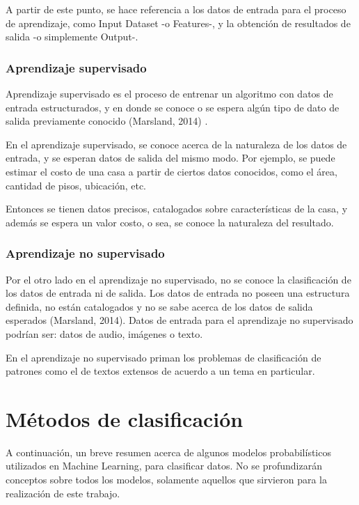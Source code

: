 \documentclass[a4paper,12pt,oneside,spanish]{book}
\begin{document}
A partir de este punto, se hace referencia a los datos de entrada para el proceso de aprendizaje, como Input Dataset -o Features-, y la obtención de resultados de salida -o simplemente Output-.\par

\subsubsection{Aprendizaje supervisado}

Aprendizaje supervisado es el proceso de entrenar un algoritmo con datos de entrada estructurados, y en donde se conoce o se espera algún tipo de dato de salida previamente conocido (Marsland, 2014) .\par

En el aprendizaje supervisado, se conoce acerca de la naturaleza de los datos de entrada, y se esperan datos de salida del mismo modo. Por ejemplo, se puede estimar el costo de una casa a partir de ciertos datos conocidos, como el área, cantidad de pisos, ubicación, etc.  \par

Entonces se tienen datos precisos, catalogados sobre características de la casa, y además se espera un valor costo, o sea, se conoce la naturaleza del resultado.\par

\subsubsection{Aprendizaje no supervisado}

Por el otro lado en el aprendizaje no supervisado, no se conoce la clasificación de los datos de entrada ni de salida. Los datos de entrada no poseen una estructura definida, no están catalogados y no se sabe acerca de los datos de salida esperados (Marsland, 2014). Datos de entrada para el aprendizaje no supervisado podrían ser: datos de audio, imágenes o texto. \par

En el aprendizaje no supervisado priman los problemas de clasificación de patrones como el de textos extensos de acuerdo a un tema en particular.\par

\section{Métodos de clasificación}\label{clasificacion}
A continuación, un breve resumen acerca de algunos modelos probabilísticos utilizados en Machine Learning, para clasificar datos. No se profundizarán conceptos sobre todos los modelos, solamente aquellos que sirvieron para la realización de este trabajo. \par
\end{document}
